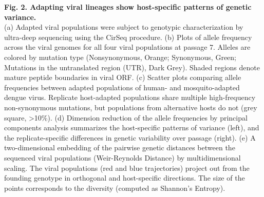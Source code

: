\documentclass[
]{article}
\begin{document}
\textbf{Fig. 2. Adapting viral lineages show host-specific patterns of
genetic variance.\\
}(a) Adapted viral populations were subject to genotypic
characterization by ultra-deep sequencing using the CirSeq procedure.
(b) Plots of allele frequency across the viral genomes for all four
viral populations at passage 7. Alleles are colored by mutation type
(Nonsynonymous, Orange; Synonymous, Green; Mutations in the untranslated
region (UTR), Dark Grey). Shaded regions denote mature peptide
boundaries in viral ORF. (c) Scatter plots comparing allele frequencies
between adapted populations of human- and mosquito-adapted dengue virus.
Replicate host-adapted populations share multiple high-frequency
non-synonymous mutations, but populations from alternative hosts do not
(grey square, \textgreater10\%). (d) Dimension reduction of the allele
frequencies by principal components analysis summarizes the
host-specific patterns of variance (left), and the replicate-specific
differences in genetic variability over passage (right). (e) A
two-dimensional embedding of the pairwise genetic distances between the
sequenced viral populations (Weir-Reynolds Distance) by multidimensional
scaling. The viral populations (red and blue trajectories) project out
from the founding genotype in orthogonal and host-specific directions.
The size of the points corresponds to the diversity (computed as
Shannon's Entropy).
\end{document}
